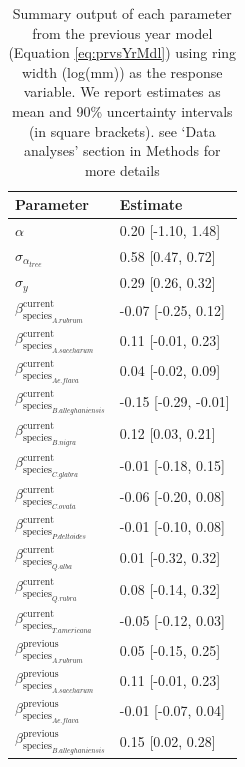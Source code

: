 \documentclass{article}\usepackage[]{graphicx}\usepackage[]{xcolor}
\begin{document}
\begin{table}[ht]
\centering
\caption{Summary output of each parameter from the previous year model (Equation \ref{eq:prvsYrMdl}) using ring width (log(mm)) as the response variable. We report estimates as mean and 90\% uncertainty intervals (in square brackets). see `Data analyses' section in Methods for more details} 
\label{tab:tab_PrvsYr}
\begin{tabular}{ll}
  \hline
Parameter & Estimate \\ 
  \hline
$\alpha$ & 0.20 [-1.10, 1.48] \\ 
  $\sigma_{\alpha_{tree}}$ & 0.58 [0.47, 0.72] \\ 
  $\sigma_{y}$ & 0.29 [0.26, 0.32] \\ 
  $\beta_{\text{species}_{A. rubrum}}^{\text{current}}$ & -0.07 [-0.25, 0.12] \\ 
  $\beta_{\text{species}_{A. saccharum}}^{\text{current}}$ & 0.11 [-0.01, 0.23] \\ 
  $\beta_{\text{species}_{Ae. flava}}^{\text{current}}$ & 0.04 [-0.02, 0.09] \\ 
  $\beta_{\text{species}_{B. alleghaniensis}}^{\text{current}}$ & -0.15 [-0.29, -0.01] \\ 
  $\beta_{\text{species}_{B. nigra}}^{\text{current}}$ & 0.12 [0.03, 0.21] \\ 
  $\beta_{\text{species}_{C. glabra}}^{\text{current}}$ & -0.01 [-0.18, 0.15] \\ 
  $\beta_{\text{species}_{C. ovata}}^{\text{current}}$ & -0.06 [-0.20, 0.08] \\ 
  $\beta_{\text{species}_{P. deltoides}}^{\text{current}}$ & -0.01 [-0.10, 0.08] \\ 
  $\beta_{\text{species}_{Q. alba}}^{\text{current}}$ & 0.01 [-0.32, 0.32] \\ 
  $\beta_{\text{species}_{Q. rubra}}^{\text{current}}$ & 0.08 [-0.14, 0.32] \\ 
  $\beta_{\text{species}_{T. americana}}^{\text{current}}$ & -0.05 [-0.12, 0.03] \\ 
  $\beta_{\text{species}_{A. rubrum}}^{\text{previous}}$ & 0.05 [-0.15, 0.25] \\ 
  $\beta_{\text{species}_{A. saccharum}}^{\text{previous}}$ & 0.11 [-0.01, 0.23] \\ 
  $\beta_{\text{species}_{Ae. flava}}^{\text{previous}}$ & -0.01 [-0.07, 0.04] \\ 
  $\beta_{\text{species}_{B. alleghaniensis}}^{\text{previous}}$ & 0.15 [0.02, 0.28] \\ 

\end{tabular}
\end{table}
\end{document}
